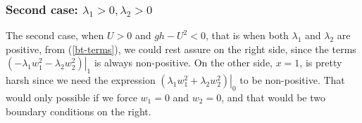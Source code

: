 \documentclass{article}
\theoremstyle{definition}
\begin{document}
        \subsubsection{Second case: $\lambda_1 >0, \lambda_2 >0$}
        The second case, when $U>0$ and $gh - U^2 < 0$, that is when both $\lambda_1$ and $\lambda_2$
        are positive, from (\ref{bt-terms}), we could rest assure on the right side, since 
        the terms  $\left.(-\lambda_1 w_1^2 - \lambda_2 w_2^2) \right\vert_1$ is always non-positive. 
        On the other side, $x=1$, is pretty harsh since we need the expression
        $\left.(\lambda_1 w_1^2 + \lambda_2 w_2^2) \right\vert_0$
        to be non-positive. That would only possible if we force $w_1 = 0$ and $w_2 =0$, 
        and that would be two boundary conditions on the right. 
\end{document}
